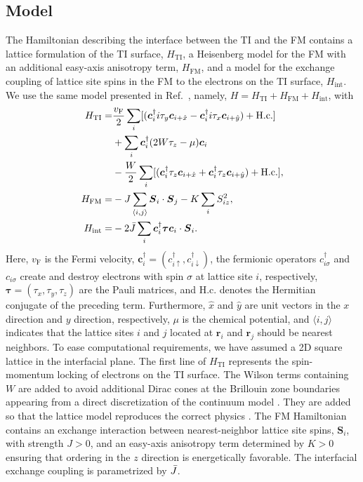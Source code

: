 \documentclass[aps, prb, twocolumn,amsmath,amssymb,floatfix]{revtex4-2}
\begin{document}
\subsection{Model}
The Hamiltonian describing the interface between the TI and the FM contains a lattice formulation of the TI surface, $H_{\textrm{TI}}$, a Heisenberg model for the FM with an additional easy-axis anisotropy term, $H_{\textrm{FM}}$, and a model for the exchange coupling of lattice site spins in the FM to the electrons on the TI surface, $H_{\textrm{int}}$. We use the same model presented in Ref.~\cite{EirikTIFMAFM}, namely, $H=H_{\textrm{TI}}+H_{\textrm{FM}}+H_{\textrm{int}}$, with
\begin{align}
    H_{\textrm{TI}} =& \frac{v_{\textrm{F}}}{2}\sum_{i} [(\boldsymbol{c}_i^\dagger i\tau_y \boldsymbol{c}_{i+\hat{x}} - \boldsymbol{c}_i^\dagger i\tau_x \boldsymbol{c}_{i+\hat{y}}) + \textrm{H.c.}]  \nonumber \\ 
    &+\sum_{i} \boldsymbol{c}_i^\dagger (2W\tau_z-\mu) \boldsymbol{c}_{i}  \nonumber \\ 
    &-\frac{W}{2} \sum_{i} [(\boldsymbol{c}_i^\dagger \tau_z \boldsymbol{c}_{i+\hat{x}} + \boldsymbol{c}_i^\dagger \tau_z \boldsymbol{c}_{i+\hat{y}}) + \textrm{H.c.}], \label{eq:HTIorig} \\
    H_{\textrm{FM}} =& -J \sum_{\langle i,j \rangle} \boldsymbol{S}_i \cdot \boldsymbol{S}_j - K \sum_{i} S_{iz}^2 , \\
    H_{\textrm{int}} =& -2\Bar{J} \sum_{i} \boldsymbol{c}_i^\dagger \boldsymbol{\tau} \boldsymbol{c}_{i} \cdot \boldsymbol{S}_i.
\end{align}
Here, $v_{\textrm{F}}$ is the Fermi velocity, $\boldsymbol{c}_i^\dagger = (c_{i\uparrow}^\dagger, c_{i\downarrow}^\dagger)$, the fermionic operators $c_{i\sigma}^\dagger$ and $c_{i\sigma}$ create and destroy electrons with spin $\sigma$ at lattice site $i$, respectively, $\boldsymbol{\tau} = (\tau_x, \tau_y, \tau_z)$ are the Pauli matrices, and H.c. denotes the Hermitian conjugate of the preceding term. Furthermore, $\hat{x}$ and $\hat{y}$ are unit vectors in the $x$ direction and $y$ direction, respectively, $\mu$ is the chemical potential, and $\langle i,j \rangle$ indicates that the lattice sites $i$ and $j$ located at $\boldsymbol{r}_i$ and $\boldsymbol{r}_j$ should be nearest neighbors. 
To ease computational requirements, we have assumed a 2D square lattice in the interfacial plane. The first line of $H_{\textrm{TI}}$ represents the spin-momentum locking of electrons on the TI surface. The Wilson terms containing $W$ are added to avoid additional Dirac cones at the Brillouin zone boundaries appearing from a direct discretization of the continuum model \cite{WilsonZhou}. They are added so that the lattice model reproduces the correct physics \cite{EirikTIFMAFM, WilsonZhou}. 
The FM Hamiltonian contains an exchange interaction between nearest-neighbor lattice site spins, $\boldsymbol{S}_i$, with strength $J> 0$, and an easy-axis anisotropy term determined by $K>0$ ensuring that ordering in the $z$ direction is energetically favorable. The interfacial exchange coupling is parametrized by $\Bar{J}$.
\end{document}
